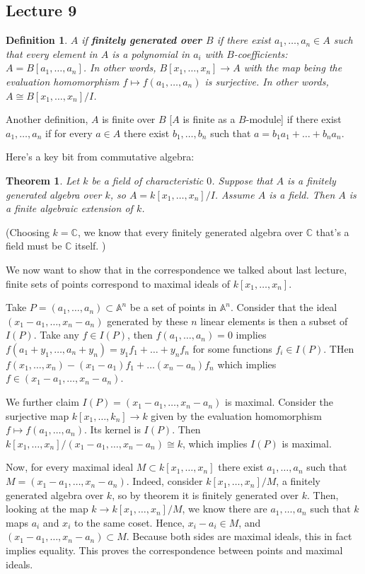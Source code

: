 \documentclass[12pt]{article}
\newcommand{\C}{\mathbb{C}}
\newcommand{\A}{\mathbb{A}}
\newtheorem{definition}{Definition}
\newtheorem{theorem}{Theorem}
\begin{document}
    \subsection{Lecture 9}
    \begin{definition}
        $A$ if \textbf{finitely generated over $B$} if there exist $a_1, \dots, a_n \in A$ such that every element in $A$ is a polynomial in $a_i$ with $B$-coefficients: $A = B[a_1, \dots, a_n]$. In other words, $B[x_1, \dots, x_n] \to A$ with the map being the evaluation homomorphism $f \mapsto f(a_1, \dots, a_n)$ is surjective. In other words, $A \cong B[x_1, \dots, x_n]/I$. 
    \end{definition}
    Another definition, $A$ is finite over $B$ [$A$ is finite as a $B$-module] if there exist $a_1, \dots, a_n$ if for every $a \in A$ there exist $b_1, \dots, b_n$ such that $a = b_1a_1 + \dots + b_na_n$.\par 
    Here's a key bit from commutative algebra: 
    \begin{theorem}
        Let $k$ be a field of characteristic $0$. Suppose that $A$ is a finitely generated algebra over $k$, so $A = k[x_1, \dots, x_n]/I$. Assume $A$ is a field. Then $A$ is a finite algebraic extension of $k$. 
    \end{theorem}
    (Choosing $k = \C$, we know that every finitely generated algebra over $\C$ that's a field must be $\C$ itself. )\par
    We now want to show that in the correspondence we talked about last lecture, finite sets of points correspond to maximal ideals of $k[x_1, \dots, x_n]$. \par 
    Take $P = (a_1, \dots, a_n) \subset \A^n$ be a set of points in $\A^n$. Consider that the ideal $(x_1 - a_1, \dots, x_n - a_n)$ generated by these $n$ linear elements is then a subset of $I(P)$. Take any $f \in I(P)$, then $f(a_1, \dots, a_n) = 0$ implies $f(a_1 + y_1, \dots, a_n + y_n) = y_1f_1 + \dots + y_nf_n$ for some functions $f_i \in I(P)$. THen $f(x_1, \dots, x_n) - (x_1 - a_1)f_1 + \dots (x_n - a_n)f_n$ which implies $f \in (x_1-a_1, \dots, x_n-a_n)$. \par 
    We further claim $I(P) = (x_1 - a_1, \dots, x_n - a_n)$ is maximal. Consider the surjective map $k[x_1, \dots, k_n] \to k $ given by the evaluation homomorphism $f \mapsto f(a_1, \dots, a_n)$. Its kernel is $I(P)$. Then $k[x_1, \dots, x_n]/(x_1- a_1, \dots, x_n - a_n) \cong k$, which implies $I(P)$ is maximal. \par 
    Now, for every maximal ideal $M \subset k[x_1, \dots, x_n]$ there exist $a_1, \dots, a_n$ such that $M = (x_1 - a_1, \dots, x_n - a_n)$. Indeed, consider $k[x_1, \dots, x_n]/M$, a finitely generated algebra over $k$, so by theorem it is finitely generated over $k$. Then, looking at the map $k \to k[x_1, \dots, x_n]/M$, we know there are $a_1, \dots, a_n$ such that $k$ maps $a_i$ and $x_i$ to the same coset. Hence, $x_i - a_i \in M$, and $(x_1 - a_1, \dots, x_n - a_n) \subset M$. Because both sides are maximal ideals, this in fact implies equality. This proves the correspondence between points and maximal ideals. \par 
\end{document}

